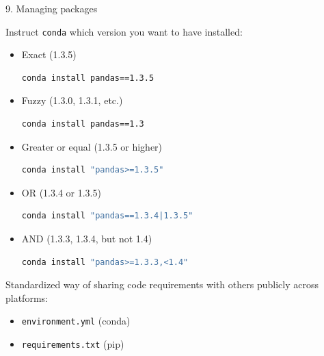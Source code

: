 \documentclass[11pt,compress,t,notes=noshow, xcolor=table]{beamer}
\begin{document}
\begin{vbframe}{9. Managing packages}

\vfill

Instruct \texttt{conda} which version you want to have installed:

\begin{itemize}
	\item Exact (1.3.5)
\begin{lstlisting}[language=bash]
conda install pandas==1.3.5
\end{lstlisting}
	\item Fuzzy (1.3.0, 1.3.1, etc.)
\begin{lstlisting}[language=bash]
conda install pandas==1.3
\end{lstlisting}
	\item Greater or equal (1.3.5 or higher)
\begin{lstlisting}[language=bash]
conda install "pandas>=1.3.5"
\end{lstlisting}
	\item OR (1.3.4 or 1.3.5)
\begin{lstlisting}[language=bash]
conda install "pandas==1.3.4|1.3.5"
\end{lstlisting}
	\item AND (1.3.3, 1.3.4, but not 1.4)
\begin{lstlisting}[language=bash]
conda install "pandas>=1.3.3,<1.4"
\end{lstlisting}

\end{itemize}

\vfill

\end{vbframe}


\begin{vbframe}{}

\vfill

Standardized way of sharing code requirements with others publicly across platforms:

\vspace{.3cm}

\begin{itemize}
	\item \texttt{environment.yml} (conda)
	\item \texttt{requirements.txt} (pip)
\end{itemize}

\vfill

\end{vbframe}
\end{document}
